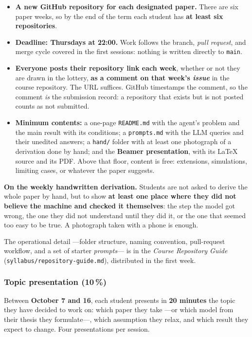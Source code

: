 \documentclass[11pt]{article}
\begin{document}
\begin{itemize}
\item \textbf{A new GitHub repository for each designated paper.} There are six paper weeks, so by the end of the term each student has \textbf{at least six repositories}.
\item \textbf{Deadline: Thursdays at 22:00.} Work follows the branch, \emph{pull request}, and merge cycle covered in the first sessions: nothing is written directly to \texttt{main}.
\item \textbf{Everyone posts their repository link each week}, whether or not they are drawn in the lottery, \textbf{as a comment on that week's \emph{issue}} in the course repository. The URL suffices. GitHub timestamps the comment, so the comment \emph{is} the submission record: a repository that exists but is not posted counts as not submitted.
\item \textbf{Minimum contents:} a one-page \texttt{README.md} with the agent's problem and the main result with its conditions; a \texttt{prompts.md} with the LLM queries and their unedited answers; a \texttt{hand/} folder with at least one photograph of a derivation done by hand; and the \textbf{Beamer presentation}, with its \LaTeX{} source and its PDF. Above that floor, content is free: extensions, simulations, limiting cases, or whatever the paper suggests.
\end{itemize}

\textbf{On the weekly handwritten derivation.} Students are not asked to derive the whole paper by hand, but to show \textbf{at least one place where they did not believe the machine and checked it themselves}: the step the model got wrong, the one they did not understand until they did it, or the one that seemed too easy to be true. A photograph taken with a phone is enough.

The operational detail ---folder structure, naming convention, pull-request workflow, and a set of starter \emph{prompts}--- is in the \emph{Course Repository Guide} (\texttt{syllabus/repository-guide.md}), distributed in the first week.

\subsubsection*{Topic presentation (10\,\%)}

Between \textbf{October 7 and 16}, each student presents in \textbf{20 minutes} the topic they have decided to work on: which paper they take ---or which model from their thesis they formulate---, which assumption they relax, and which result they expect to change. Four presentations per session.
\end{document}

